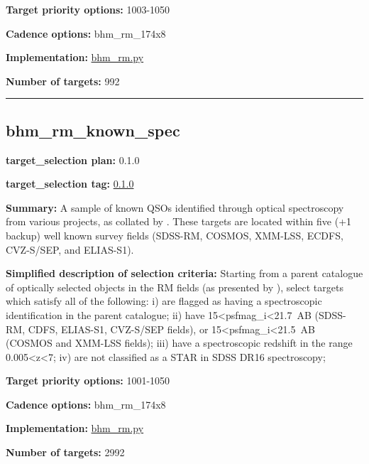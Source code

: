 \noindent\textbf{Target priority options:} 1003-1050

\noindent\textbf{Cadence options:} bhm\_rm\_174x8

\noindent\textbf{Implementation:}
\href{https://github.com/sdss/target_selection/blob/0.1.0/python/target_selection/cartons/bhm_rm.py}{bhm\_rm.py}

\noindent\textbf{Number of targets:} 992

\begin{center}\rule{0.5\linewidth}{0.5pt}\end{center}

\hypertarget{bhm_rm_known_spec_plan0.1.0}{%
\subsection{bhm\_rm\_known\_spec}\label{bhm_rm_known_spec_plan0.1.0}}

\noindent\textbf{target\_selection plan:} 0.1.0

\noindent\textbf{target\_selection tag:}
\href{https://github.com/sdss/target_selection/tree/0.1.0/}{0.1.0}

\noindent\textbf{Summary:} A sample of known QSOs identified through optical
spectroscopy from various projects, as collated by
\citet{Yang2022}. These targets are located within five (+1 backup) well
known survey fields (SDSS-RM, COSMOS, XMM-LSS, ECDFS, CVZ-S/SEP, and
ELIAS-S1).

\noindent\textbf{Simplified description of selection criteria:} Starting from a
parent catalogue of optically selected objects in the RM fields (as
presented by
\citealt{Yang2022}), select targets which satisfy all of the following: i)
are flagged as having a spectroscopic identification in the parent
catalogue; ii) have 15\textless psfmag\_i\textless21.7~AB (SDSS-RM,
CDFS, ELIAS-S1, CVZ-S/SEP fields), or
15\textless psfmag\_i\textless21.5~AB (COSMOS and XMM-LSS fields); iii)
have a spectroscopic redshift in the range 0.005\textless z\textless7;
iv) are not classified as a STAR in SDSS DR16 spectroscopy;


\noindent\textbf{Target priority options:} 1001-1050

\noindent\textbf{Cadence options:} bhm\_rm\_174x8

\noindent\textbf{Implementation:}
\href{https://github.com/sdss/target_selection/blob/0.1.0/python/target_selection/cartons/bhm_rm.py}{bhm\_rm.py}

\noindent\textbf{Number of targets:} 2992

